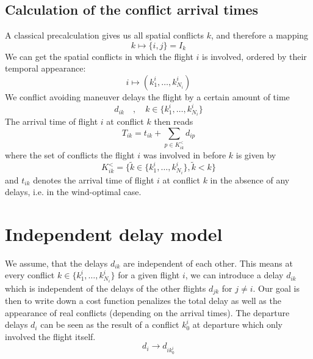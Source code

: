 \documentclass{article}
\begin{document}
\subsection{Calculation of the conflict arrival times}
A classical precalculation gives us all spatial conflicts $k$, and therefore a mapping
\begin{equation*}
    k \mapsto \{i, j\} = I_k
\end{equation*}
We can get the spatial conflicts in which the flight $i$ is involved, ordered by their temporal appearance:
\begin{equation*}
    i \mapsto (k^i_1, \dots, k^i_{N_i})
\end{equation*}
We conflict avoiding maneuver delays the flight by a certain amount of time
\begin{equation*}
    d_{ik} \quad, \quad  k\in\{k^i_1, \dots, k^i_{N_i}\}
\end{equation*}
The arrival time of flight $i$ at conflict $k$ then reads
\begin{equation*}
    T_{ik} = t_{ik} + \sum_{p \in K^<_{ik}} d_{ip}
\end{equation*}
where the set of conflicts the flight $i$ was involved in before $k$ is given by
\begin{equation*}
    K^<_{ik} = \{\tilde k \in\{k^i_1, \dots, k^i_{N_i}\}, \tilde k < k\}
\end{equation*}
and $t_{ik}$ denotes the arrival time of flight $i$ at conflict $k$ in the absence of any delays, i.e. in the wind-optimal case.

\section{Independent delay model}
We assume, that the delays $d_{ik}$ are independent of each other. 
This means at every conflict $k \in  \{k^i_1, \dots, k^i_{N_i}\}$ for a given flight $i$, we can introduce a delay $d_{ik}$ which is independent of the delays of the other flights $d_{jk}$ for $j\neq i$.
Our goal is then to write down a cost function penalizes the total delay as well as the appearance of real conflicts (depending on the arrival times).
The departure delays $d_i$ can be seen as the result of a conflict $k^i_0$ at departure which only involved the flight itself.
\begin{equation*}
    d_i \to d_{ik^i_0}
\end{equation*}
\end{document}
